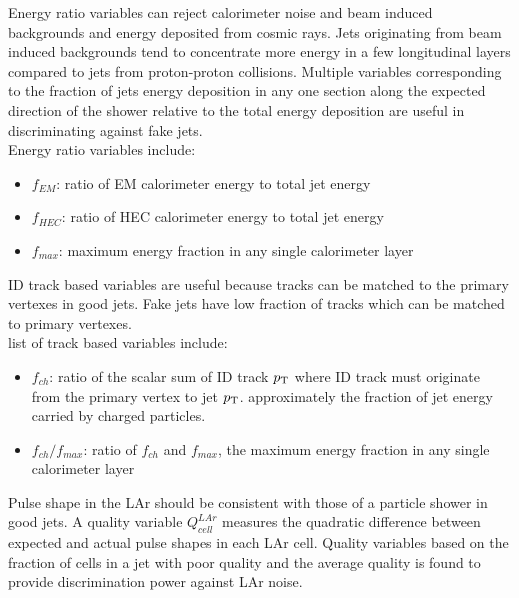 \indent Energy ratio variables can reject calorimeter noise and beam induced backgrounds and energy deposited from cosmic rays.  Jets originating from beam induced backgrounds tend to concentrate more energy in a few longitudinal layers compared to jets from proton-proton collisions.  Multiple variables corresponding to the fraction of jets energy deposition in any one section along the expected direction of the shower relative to the total energy deposition are useful in discriminating against fake jets. \\

\indent Energy ratio variables include: \\

\begin{itemize}
\item[] $f_{EM}$: ratio of EM calorimeter energy to total jet energy
\item[] $f_{HEC}$: ratio of HEC calorimeter energy to total jet energy
\item[] $f_{max}$: maximum energy fraction in any single calorimeter layer
\end{itemize}

\indent ID track based variables are useful because tracks can be matched to the primary vertexes in good jets.  Fake jets have low fraction of tracks which can be matched to primary vertexes.  \\

\indent list of track based variables include: \\

\begin{itemize}
\item[] $f_{ch}$: ratio of the scalar sum of ID track $p_{\mathrm{T}}$ where ID track must originate from the primary vertex to jet $p_{\mathrm{T}}$.  approximately the fraction of jet energy carried by charged particles.  
\item[] $f_{ch}/f_{max}$: ratio of $f_{ch}$ and $f_{max}$, the maximum energy fraction in any single calorimeter layer
\end{itemize}

\indent Pulse shape in the LAr should be consistent with those of a particle shower in good jets.  A quality variable $Q^{LAr}_{cell}$ measures the quadratic difference between expected and actual pulse shapes in each LAr cell.  Quality variables based on the fraction of cells in a jet with poor quality and the average quality is found to provide discrimination power against LAr noise. \\

